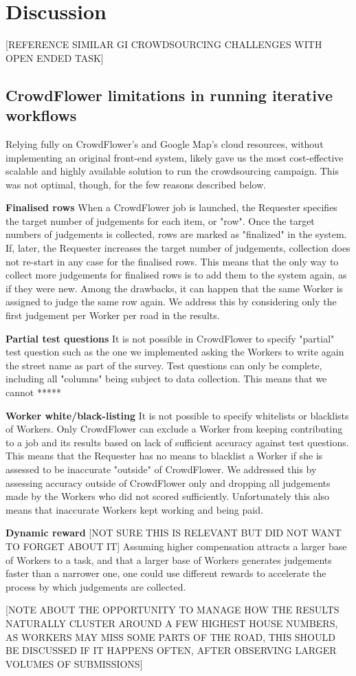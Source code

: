 \section{Discussion}

[REFERENCE \cite{Gottlieb:2012fh} SIMILAR GI CROWDSOURCING CHALLENGES WITH OPEN ENDED TASK]

\subsection{CrowdFlower limitations in running iterative workflows}

Relying fully on CrowdFlower's and Google Map's cloud resources, without implementing an original front-end system, likely gave us the most cost-effective scalable and highly available solution to run the crowdsourcing campaign. This was not optimal, though, for the few reasons described below. 

\textbf{Finalised rows} When a CrowdFlower job is launched, the Requester specifies the target number of judgements for each item, or "row". Once the target numbers of judgements is collected, rows are marked as "finalized" in the system. If, later, the Requester increases the target number of judgements, collection does not re-start in any case for the finalised rows. This means that the only way to collect more judgements for finalised rows is to add them to the system again, as if they were new. Among the drawbacks, it can happen that the same Worker is assigned to judge the same row again. We address this by considering only the first judgement per Worker per road in the results.

\textbf{Partial test questions} It is not possible in CrowdFlower to specify "partial" test question such as the one we implemented asking the Workers to write again the street name as part of the survey. Test questions can only be complete, including all "columns" being subject to data collection. This means that we cannot *****  

\textbf{Worker white/black-listing} It is not possible to specify whitelists or blacklists of Workers. Only CrowdFlower can exclude a Worker from keeping contributing to a job and its results based on lack of sufficient accuracy against test questions. This means that the Requester has no means to blacklist a Worker if she is assessed to be inaccurate "outside" of CrowdFlower. We addressed this by assessing accuracy outside of CrowdFlower only and dropping all judgements made by the Workers who did not scored sufficiently. Unfortunately this also means that inaccurate Workers kept working and being paid.

\textbf{Dynamic reward} [NOT SURE THIS IS RELEVANT BUT DID NOT WANT TO FORGET ABOUT IT] Assuming higher compensation attracts a larger base of Workers to a task, and that a larger base of Workers generates judgements faster than a narrower one, one could use different rewards to accelerate the process by which judgements are collected.

[NOTE ABOUT THE OPPORTUNITY TO MANAGE HOW THE RESULTS NATURALLY CLUSTER AROUND A FEW HIGHEST HOUSE NUMBERS, AS WORKERS MAY MISS SOME PARTS OF THE ROAD, THIS SHOULD BE DISCUSSED IF IT HAPPENS OFTEN, AFTER OBSERVING LARGER VOLUMES OF SUBMISSIONS]